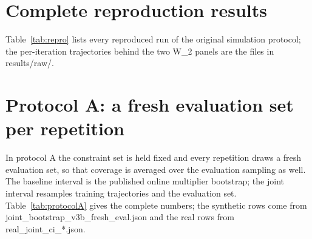 \documentclass[11pt]{article}
\begin{document}
\section{Complete reproduction results}

Table~\ref{tab:repro} lists every reproduced run of the original simulation protocol; the per-iteration trajectories behind the two W_2 panels are the files in results/raw/.


\begin{table}[h]
\centering
\small
\caption{Reproduction of the original simulation protocol (fixed held-out set; results/tables/repro_summary.csv). The interval covers the held-out estimand but not the population gap.}
\label{tab:repro}
\end{table}

\section{Protocol A: a fresh evaluation set per repetition}

In protocol A the constraint set is held fixed and every repetition draws a fresh
evaluation set, so that coverage is averaged over the evaluation sampling as well.  The
baseline interval is the published online multiplier bootstrap; the joint interval resamples
training trajectories and the evaluation set.  Table~\ref{tab:protocolA} gives the complete
numbers; the synthetic rows come from joint_bootstrap_v3b_fresh_eval.json and the real rows
from real_joint_ci_*.json.
\end{document}
